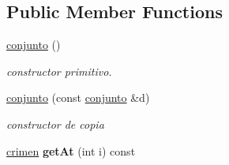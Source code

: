 \subsection*{Public Member Functions}
\begin{DoxyCompactItemize}
\item 
\hyperlink{classconjunto_a16d987f42c679efab01748178ba45891}{conjunto} ()
\begin{DoxyCompactList}\small\item\em constructor primitivo. \end{DoxyCompactList}\item 
\hyperlink{classconjunto_ab0944b1f9a0c959ca314ce0debd5def9}{conjunto} (const \hyperlink{classconjunto}{conjunto} \&d)
\begin{DoxyCompactList}\small\item\em constructor de copia \end{DoxyCompactList}\item 
\hypertarget{classconjunto_a6c4451be88b580175e567b98a31be3a9}{\hyperlink{classcrimen}{crimen} {\bfseries get\-At} (int i) const }\label{classconjunto_a6c4451be88b580175e567b98a31be3a9}


\end{DoxyCompactItemize}
